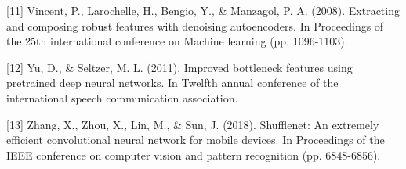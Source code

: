 {[11] Vincent, P., Larochelle, H., Bengio, Y., \& Manzagol, P. A. (2008). Extracting and composing robust features with denoising autoencoders. In Proceedings of the 25th international conference on Machine learning (pp. 1096-1103).

[12] Yu, D., \& Seltzer, M. L. (2011). Improved bottleneck features using pretrained deep neural networks. In Twelfth annual conference of the international speech communication association.

[13] Zhang, X., Zhou, X., Lin, M., \& Sun, J. (2018). Shufflenet: An extremely efficient convolutional neural network for mobile devices. In Proceedings of the IEEE conference on computer vision and pattern recognition (pp. 6848-6856).

} 